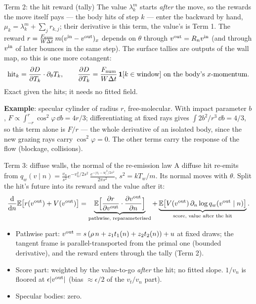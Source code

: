\begin{frame}{Term 2: the hit reward (tally)}
The value $\lambda^m_k$ starts \emph{after} the move, so the rewards the move itself pays --- the
body hits of step $k$ --- enter the backward by hand, $\mu_k = \lambda^m_k + \sum_j r_{k,j}$; their
derivative is this term, the value's is Term 1.
The reward $r = \frac{F_{\mathrm{num}}}{W\Delta t}\,m(v^{\mathrm{in}} - v^{\mathrm{out}})_x$ depends on $\theta$
through $v^{\mathrm{out}} = R_nv^{\mathrm{in}}$ (and through $v^{\mathrm{in}}$ of later bounces in the same step).  The
surface tallies are outputs of the wall map, so this is one more cotangent:
\[
\text{hit}_k = \frac{\partial D}{\partial T_k}\cdot\partial_\theta T_k,\qquad
\frac{\partial D}{\partial T_k} = \frac{F_{\mathrm{num}}}{W\Delta t}\,\mathbf{1}[k\in\text{window}]
\ \text{on the body's } x\text{-momentum}.
\]
Exact given the hits; it needs no fitted field.

\medskip
\textbf{Example}: specular cylinder of radius $r$, free-molecular.  With impact parameter
$b$, $F \propto \int_{-r}^{r}\cos^2\varphi\,\dd b = 4r/3$; differentiating at fixed rays gives
$\int 2b^2/r^3\,\dd b = 4/3$, so this term alone is $F/r$ --- the whole derivative of an
isolated body, since the new grazing rays carry $\cos^2\varphi = 0$.  The other terms carry
the response of the flow (blockage, collisions).
\end{frame}

\begin{frame}{Term 3: diffuse walls, the normal of the re-emission law}
A diffuse hit re-emits from $q_w(v\mid n) = \frac{v_n}{s^2}e^{-v_n^2/2s^2}\,\frac{e^{-|v_t-u|^2/2s^2}}{2\pi s^2}$,
$s^2 = kT_w/m$.  Its normal moves with $\theta$.  Split the hit's future into its reward and
the value after it:
\[
\frac{\mathrm{d}}{\mathrm{d} n}\mathbb{E}\big[r(v^{\mathrm{out}}) + V(v^{\mathrm{out}})\big]
= \underbrace{\mathbb{E}\Big[\frac{\partial r}{\partial v^{\mathrm{out}}}\cdot\frac{\partial v^{\mathrm{out}}}{\partial n}\Big]}_{\text{pathwise, reparameterised}}
+ \underbrace{\mathbb{E}\big[V(v^{\mathrm{out}})\,\partial_n\log q_w(v^{\mathrm{out}}\mid n)\big]}_{\text{score, value after the hit}} .
\]
\begin{itemize}
\item Pathwise part: $v^{\mathrm{out}} = s\,(\rho\, n + z_1 t_1(n) + z_2 t_2(n)) + u$ at fixed draws;
  the tangent frame is parallel-transported from the primal one (bounded derivative), and
  the reward enters through the tally (Term 2).
\item Score part: weighted by the value-to-go \emph{after} the hit; no fitted slope.
  $1/v_n$ is floored at $\epsilon|v^{\mathrm{out}}|$ (bias $\approx\epsilon/2$ of the $v_t/v_n$ part).
\item Specular bodies: zero.
\end{itemize}
\end{frame}

